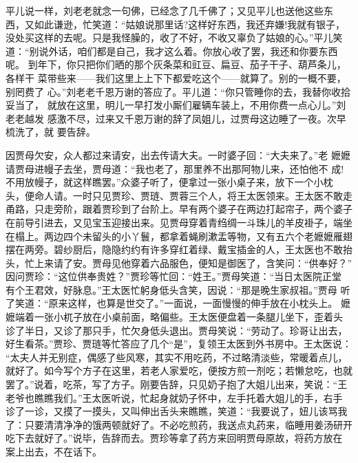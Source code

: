 平儿说一样，刘老老就念一句佛，已经念了几千佛了；又见平儿也送他这些东
西，又如此谦逊，忙笑道：“姑娘说那里话?这样好东西，我还弃嫌!我就有银子，
没处买这样的去呢。只是我怪臊的，收了不好，不收又辜负了姑娘的心。”平儿笑
道：“别说外话，咱们都是自己，我才这么着。你放心收了罢，我还和你要东西呢。
到年下，你只把你们晒的那个灰条菜和豇豆、扁豆、茄子干子、葫芦条儿，各样干
菜带些来——我们这里上上下下都爱吃这个——就算了。别的一概不要，别罔费了
心。”刘老老千恩万谢的答应了。平儿道：“你只管睡你的去，我替你收拾妥当了，
就放在这里，明儿一早打发小厮们雇辆车装上，不用你费一点心儿。”刘老老越发
感激不尽，过来又千恩万谢的辞了凤姐儿，过贾母这边睡了一夜。次早梳洗了，就
要告辞。

因贾母欠安，众人都过来请安，出去传请大夫。一时婆子回：“大夫来了。”老
嬷嬷请贾母进幔子去坐，贾母道：“我也老了，那里养不出那阿物儿来，还怕他不
成!不用放幔子，就这样瞧罢。”众婆子听了，便拿过一张小桌子来，放下一个小枕
头，便命人请。一时只见贾珍、贾琏、贾蓉三个人，将王太医领来。王太医不敢走
甬路，只走旁阶，跟着贾珍到了台阶上。早有两个婆子在两边打起帘子，两个婆子
在前导引进去，又见宝玉迎接出来。见贾母穿着青绉绸一斗珠儿的羊皮褂子，端坐
在榻上。两边四个未留头的小丫鬟，都拿着蝇刷漱盂等物，又有五六个老嬷嬷雁翅
摆在两旁。碧纱厨后，隐隐约约有许多穿红着绿、戴宝插金的人，王太医也不敢抬
头，忙上来请了安。贾母见他穿着六品服色，便知是御医了，含笑问：“供奉好？”
因问贾珍：“这位供奉贵姓？”贾珍等忙回：“姓王。”贾母笑道：“当日太医院正堂
有个王君效，好脉息。”王太医忙躬身低头含笑，因说：“那是晚生家叔祖。”贾母
听了笑道：“原来这样，也算是世交了。”一面说，一面慢慢的伸手放在小枕头上。
嬷嬷端着一张小杌子放在小桌前面，略偏些。王太医便盘着一条腿儿坐下，歪着头
诊了半日，又诊了那只手，忙欠身低头退出。贾母笑说：“劳动了。珍哥让出去，
好生看茶。”贾珍、贾琏等忙答应了几个“是”，复领王太医到外书房中。王太医说：
“太夫人并无别症，偶感了些风寒，其实不用吃药，不过略清淡些，常暖着点儿，
就好了。如今写个方子在这里，若老人家爱吃，便按方煎一剂吃；若懒怠吃，也就
罢了。”说着，吃茶，写了方子。刚要告辞，只见奶子抱了大姐儿出来，笑说：“王
老爷也瞧瞧我们。”王太医听说，忙起身就奶子怀中，左手托着大姐儿的手，右手
诊了一诊，又摸了一摸头，又叫伸出舌头来瞧瞧，笑道：“我要说了，妞儿该骂我
了：只要清清净净的饿两顿就好了。不必吃煎药，我送点丸药来，临睡用姜汤研开
吃下去就好了。”说毕，告辞而去。贾珍等拿了药方来回明贾母原故，将药方放在
案上出去，不在话下。

